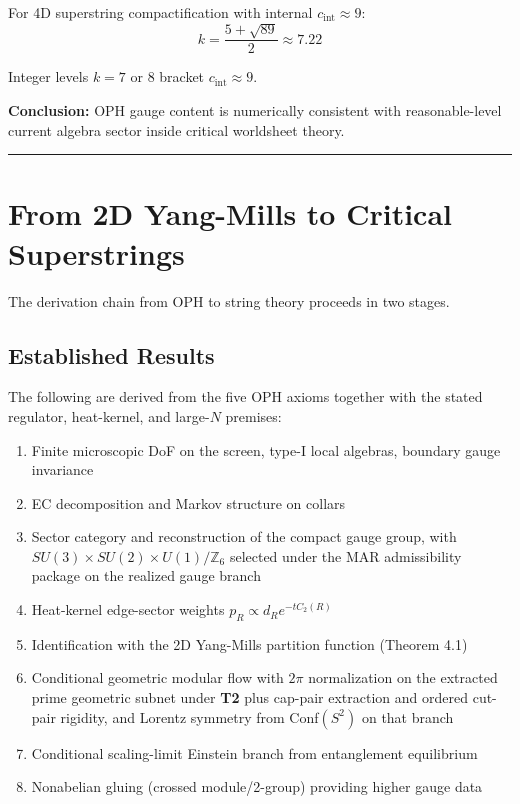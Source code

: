 For 4D superstring compactification with internal \(c_{\text{int}} \approx 9\): \[k = \frac{5 + \sqrt{89}}{2} \approx 7.22\]

Integer levels \(k = 7\) or \(8\) bracket \(c_{\text{int}} \approx 9\).

\textbf{Conclusion:} OPH gauge content is numerically consistent with reasonable-level current algebra sector inside critical worldsheet theory.

\begin{center}\rule{0.5\linewidth}{0.5pt}\end{center}

\section{From 2D Yang-Mills to Critical Superstrings}\label{9-from-2d-yang-mills-to-critical-superstrings}

The derivation chain from OPH to string theory proceeds in two stages.

\subsection{Established Results}\label{91-established-results}

The following are derived from the five OPH axioms together with the stated regulator, heat-kernel, and large-\(N\) premises:

\begin{enumerate}
\def\labelenumi{\arabic{enumi}.}
\tightlist
\item
  Finite microscopic DoF on the screen, type-I local algebras, boundary gauge invariance
\item
  EC decomposition and Markov structure on collars
\item
  Sector category and reconstruction of the compact gauge group, with \(SU(3) \times SU(2) \times U(1)/\mathbb{Z}_6\) selected under the MAR admissibility package on the realized gauge branch
\item
  Heat-kernel edge-sector weights \(p_R \propto d_R e^{-t C_2(R)}\)
\item
  Identification with the 2D Yang-Mills partition function (Theorem 4.1)
\item
  Conditional geometric modular flow with \(2\pi\) normalization on the extracted prime geometric subnet under \textbf{T2} plus cap-pair extraction and ordered cut-pair rigidity, and Lorentz symmetry from Conf\((S^2)\) on that branch
\item
  Conditional scaling-limit Einstein branch from entanglement equilibrium
\item
  Nonabelian gluing (crossed module/2-group) providing higher gauge data
\end{enumerate}

